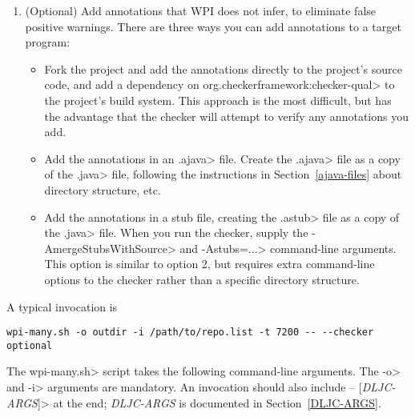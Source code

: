 \begin{enumerate}
\item (Optional) Add annotations that WPI does not infer, to eliminate
  false positive warnings. There are three ways you can add annotations to a target
  program:
  \begin{itemize}
  \item
    Fork the project and add the annotations directly to the project's
    source code, and add a dependency on
    \<org.checkerframework:checker-qual> to the project's build
    system. This approach is the most difficult, but has the advantage that
    the checker will attempt to verify any annotations you add.
  \item
    Add the annotations in an \<.ajava> file. Create the \<.ajava> file
    as a copy of the \<.java> file, following the instructions in
    Section~\ref{ajava-files} about directory structure, etc.
  \item Add the annotations in a stub file, creating the \<.astub> file as
    a copy of the \<.java> file.  When you run the checker, supply the
    \<-AmergeStubsWithSource> and \<-Astubs=...> command-line arguments.  This
    option is similar to option 2, but requires extra command-line options
    to the checker rather than a specific directory structure.
  \end{itemize}

\end{enumerate}

A typical invocation is

\begin{Verbatim}
wpi-many.sh -o outdir -i /path/to/repo.list -t 7200 -- --checker optional
\end{Verbatim}

The \<wpi-many.sh> script takes the following command-line arguments.
The \<-o> and \<-i> arguments are mandatory.
An invocation should also include \<-- [\emph{DLJC-ARGS}]> at the end;
\emph{DLJC-ARGS} is documented in Section~\ref{DLJC-ARGS}.


